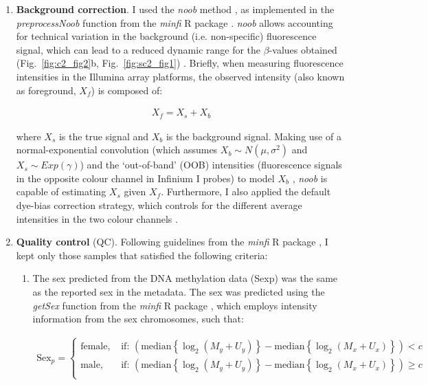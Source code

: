 \begin{enumerate}
	
	
	\item \textbf{Background correction}. I used the \textit{noob} method \cite{TricheJr2013}, as implemented in the \textit{preprocessNoob} function from the \textit{minfi} R package \cite{Aryee2014}. \textit{noob} allows accounting for technical variation in the background (i.e. non-specific) fluorescence signal, which can lead to a reduced dynamic range for the $\beta$-values obtained (Fig.~\ref{fig:c2_fig2}b, Fig.~\ref{fig:sc2_fig1}) \cite{TricheJr2013}. Briefly, when measuring fluorescence intensities in the Illumina array platforms, the observed intensity (also known as foreground, $X_f$) is composed of:
	
	\begin{align}
	X_f = X_s + X_b
	\end{align}
	
	where $X_s$ is the true signal and $X_b$ is the background signal. Making use of a normal-exponential convolution (which assumes $X_b\sim N(\mu, \sigma^2)$ and $X_s\sim Exp(\gamma)$) and the `out-of-band' (\acrshort{OOB}) intensities (fluorescence signals in the opposite colour channel in Infinium I probes) to model $X_b$ , \textit{noob} is capable of estimating $X_s$ given $X_f$. Furthermore, I also applied the default dye-bias correction strategy, which controls for the different average intensities in the two colour channels \cite{TricheJr2013}. 
	
		\item \textbf{Quality control} (QC). Following guidelines from the \textit{minfi} R package \cite{Aryee2014}, I kept only those samples that satisfied the following criteria:
		
		\begin{enumerate}
			
			\item The sex predicted from the DNA methylation data (\acrshort{Sexp}) was the same as the reported sex in the metadata. The sex was predicted  using the \textit{getSex} function from the \textit{minfi} R package \cite{Aryee2014}, which employs intensity information from the sex chromosomes, such that:
			
			\begin{align}
			\text{Sex}_{p} = 
			\begin{cases}
			\text{female, } &\text{if: } (\mathrm{median}\left\{\log_2(M_{y}+U_{y})\right\} -  \mathrm{median}\left\{\log_2(M_{x}+U_{x})\right\}) < c \\
			\text{male, } &\text{if: } (\mathrm{median}\left\{\log_2(M_{y}+U_{y})\right\} -  \mathrm{median}\left\{\log_2(M_{x}+U_{x})\right\}) \geq c \\
			\end{cases}
			\end{align}
			

\end{enumerate}
\end{enumerate}
